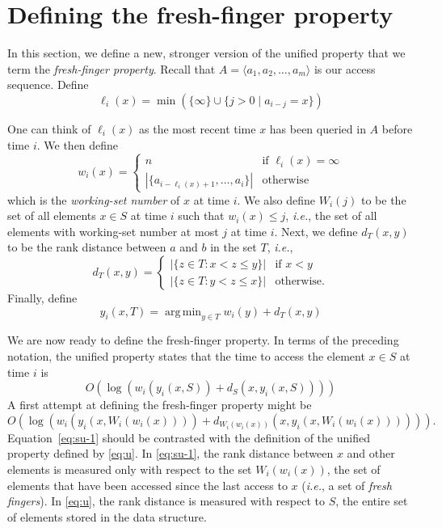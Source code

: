 \documentclass{llncs}
\newcommand{\ie}{\textsl{i.e.}}
\newcommand{\BigOh}[1]{O\!\left(#1\right)}
\DeclareMathOperator*{\argmin}{arg\,min}
\begin{document}
\section{Defining the fresh-finger property}
\label{section:definitions}

In this section, we define a new, stronger version of the unified property that we term the \emph{fresh-finger property}. Recall that $A = \langle a_1, a_2, \ldots, a_m \rangle$ is our access sequence. Define
\begin{displaymath}
	\ell_i(x) = \min \left( \{ \infty \} \cup \{ j > 0 \;|\; a_{i-j} = x \} \right)
\end{displaymath}

One can think of $\ell_i(x)$ as the most recent time $x$ has been queried in $A$ before time $i$. We then define
\begin{displaymath}
	w_i(x) =
		\begin{cases}
			n 																	& \text{if } \ell_i(x) = \infty \\
			|\{ a_{i-\ell_i(x)+1}, \ldots, a_i \}|	& \text{otherwise}
		\end{cases} 
\end{displaymath}
%
which is the \emph{working-set number} of $x$ at time $i$. We also define $W_i(j)$ to be the set of all elements $x \in S$ at time $i$ such that $w_i(x) \le j$, \ie, the set of all elements with working-set number at most $j$ at time $i$.  Next, we define $d_T(x,y)$ to be the rank distance between $a$ and $b$ in the set $T$, \ie,
\[
   d_T(x,y) 
    = \begin{cases}   
      |\{z\in T: x< z \le y\}| & \text{if $x<y$} \\
      |\{z\in T: y< z \le x\}| & \text{otherwise.}
    \end{cases}
\]
Finally, define
\begin{displaymath}
	y_i(x, T) = \argmin_{y \in T} w_i(y) + d_T(x,y)
\end{displaymath}

We are now ready to define the fresh-finger property. In terms of the preceding notation, the unified property states that the time to access the element $x \in S$ at time $i$ is 
\begin{equation}
	\BigOh{\log (w_i(y_i(x,S)) + d_S(x,y_i(x,S)))}
        \label{eq:u}
\end{equation}
%
A first attempt at defining the fresh-finger property might be 
\begin{equation}
	\BigOh{\log (w_i(y_i(x,W_i(w_i(x)))) + d_{W_i(w_i(x))}(x,y_i(x,W_i(w_i(x)))))}. \label{eq:su-1}
\end{equation}
Equation~\eqref{eq:su-1} should be contrasted with the definition of the unified property defined by \eqref{eq:u}.  In \eqref{eq:su-1}, the rank distance between $x$ and other elements is measured only with respect to the set $W_i(w_i(x))$, the set of elements that have been accessed since the last access to $x$ (\ie, a set of \emph{fresh fingers}).  In \eqref{eq:u}, the rank distance is measured with respect to $S$, the entire set of elements stored in the data structure.
\end{document}
